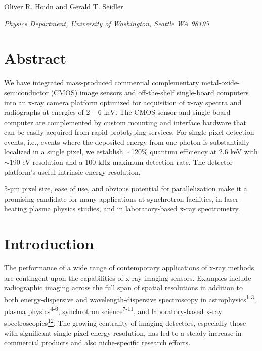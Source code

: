 \begin{center}
Oliver R.
Hoidn and Gerald T. Seidler

\emph{Physics Department, University of
Washington, Seattle WA 98195}
\end{center}


\section{Abstract}
We have integrated mass-produced commercial complementary
metal-oxide-semiconductor (CMOS) image sensors and off-the-shelf
single-board computers into an x-ray camera platform optimized for
acquisition of x-ray spectra and radiographs at energies of 2 -- 6 keV.
The CMOS sensor and single-board computer are complemented by custom
mounting and interface hardware that can be easily acquired from rapid
prototyping services. For single-pixel detection events, i.e., events
where the deposited energy from one photon is substantially localized in
a single pixel, we establish $\sim$120\% quantum efficiency at
2.6 keV with $\sim$190 eV resolution and a 100 kHz maximum
detection rate. The detector platform's useful intrinsic energy
resolution,
5-µm
pixel size, ease of use, and obvious potential for parallelization make
it a promising candidate for many applications at synchrotron
facilities, in laser-heating plasma physics studies, and in
laboratory-based x-ray spectrometry.


\section{Introduction}
The
performance of a wide range of contemporary applications of x-ray
methods are contingent upon the capabilities of x-ray imaging sensors.
Examples include radiographic imaging across the full span of spatial
resolutions in addition to both energy-dispersive and
wavelength-dispersive spectroscopy in
astrophysics\hyperref[ux5fENREFux5f1]{\textsuperscript{1-3}}, plasma
physics\hyperref[ux5fENREFux5f4]{\textsuperscript{4-6}}, synchrotron
science\hyperref[ux5fENREFux5f7]{\textsuperscript{7-11}}, and
laboratory-based x-ray
spectroscopies\hyperref[ux5fENREFux5f12]{\textsuperscript{12}}. The
growing centrality of imaging detectors, especially those with
significant single-pixel energy resolution, has led to a steady increase
in commercial products and also niche-specific research efforts.

